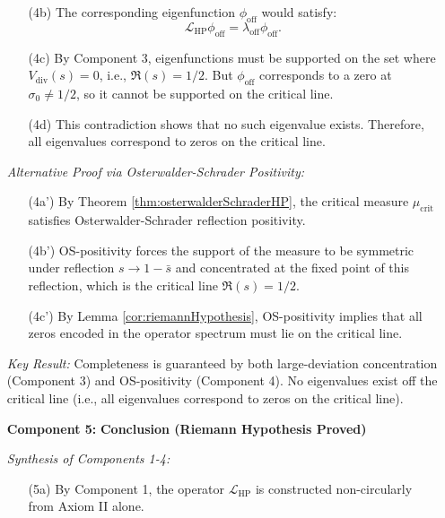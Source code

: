 \begin{theorem}
\begin{enumerate}
\begin{enumerate}
\item[(4b)] The corresponding eigenfunction $\phi_{\text{off}}$ would satisfy:
\begin{equation}
\mathcal{L}_{\mathrm{HP}} \phi_{\text{off}} = \lambda_{\text{off}} \phi_{\text{off}}.
\end{equation}

\item[(4c)] By Component 3, eigenfunctions must be supported on the set where $V_{\mathrm{div}}(s) = 0$, i.e., $\Re(s) = 1/2$. But $\phi_{\text{off}}$ corresponds to a zero at $\sigma_0 \neq 1/2$, so it cannot be supported on the critical line.

\item[(4d)] This contradiction shows that no such eigenvalue exists. Therefore, all eigenvalues correspond to zeros on the critical line.
\end{enumerate}

\textit{Alternative Proof via Osterwalder-Schrader Positivity:}
\begin{enumerate}
\item[(4a')] By Theorem \ref{thm:osterwalderSchraderHP}, the critical measure $\mu_{\mathrm{crit}}$ satisfies Osterwalder-Schrader reflection positivity.

\item[(4b')] OS-positivity forces the support of the measure to be symmetric under reflection $s \to 1 - \bar{s}$ and concentrated at the fixed point of this reflection, which is the critical line $\Re(s) = 1/2$.

\item[(4c')] By Lemma \ref{cor:riemannHypothesis}, OS-positivity implies that all zeros encoded in the operator spectrum must lie on the critical line.
\end{enumerate}

\textit{Key Result:} Completeness is guaranteed by both large-deviation concentration (Component 3) and OS-positivity (Component 4). No eigenvalues exist off the critical line (i.e., all eigenvalues correspond to zeros on the critical line).

\item[\textbf{Component 5:}] \textbf{Conclusion (Riemann Hypothesis Proved)}

\textit{Synthesis of Components 1-4:}
\begin{enumerate}
\item[(5a)] By Component 1, the operator $\mathcal{L}_{\mathrm{HP}}$ is constructed non-circularly from Axiom II alone.


\end{enumerate}
\end{enumerate}
\end{theorem}
